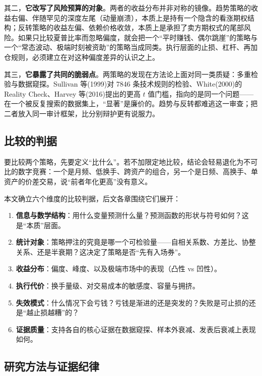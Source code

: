其二，\textbf{它改写了风险预算的对象}。两者的收益分布并非对称的镜像。趋势策略的收益右偏、伴随罕见的深度左尾（动量崩溃），本质上是持有一个隐含的看涨期权结构；反转策略的收益左偏、依赖价格收敛，本质上是承担了卖方期权式的尾部风险\cite{funghsieh2001,danielmoskowitz2016}。如果只比较夏普比率而忽略偏度，就会把一个“平时赚钱、偶尔跳崖”的策略与一个“常态波动、极端时刻被资助”的策略当成同类。执行层面的止损、杠杆、再加仓规则，必须建立在对这种偏度差异的认识之上。

其三，\textbf{它暴露了共同的脆弱点}。两策略的发现在方法论上面对同一类质疑：多重检验与数据窥探。Sullivan 等(1999)对 7846 条技术规则的检验、White(2000)的 Reality Check、Harvey 等(2016)提出的更高 $t$ 值门槛，指向的是同一个问题——在一个被反复搜索的数据集上，“显著”是廉价的\cite{sullivan1999,white2000,hlz2016}。趋势与反转都难逃这一审查；把二者放入同一审计框架，比分别辩护更有说服力。

\subsection{比较的判据}

要比较两个策略，先要定义“比什么”。若不加限定地比较，结论会轻易退化为不可比的数字竞赛：一个是月频、低换手、跨资产的组合，另一个是日频、高换手、单资产的价差交易，说“前者年化更高”没有意义。

本文确立六个维度的比较判据，后文各章围绕它们展开：

\begin{enumerate}[leftmargin=2.2em]
  \item \textbf{信息与数学结构}：用什么变量预测什么量？预测函数的形状与符号如何？这是“本质”层面。
  \item \textbf{统计对象}：策略押注的究竟是哪一个可检验量——自相关系数、方差比、协整关系、还是半衰期？这决定了策略是否“先有入场券”。
  \item \textbf{收益分布}：偏度、峰度、以及极端市场中的表现（凸性 vs 凹性）。
  \item \textbf{执行代价}：换手量级、对交易成本的敏感度、容量与拥挤。
  \item \textbf{失效模式}：什么情况下会亏钱？亏钱是渐进的还是突发的？失败是可止损的还是“越止损越糟”的？
  \item \textbf{证据质量}：支持各自的核心证据在数据窥探、样本外衰减、发表后衰减上表现如何。
\end{enumerate}

\subsection{研究方法与证据纪律}

